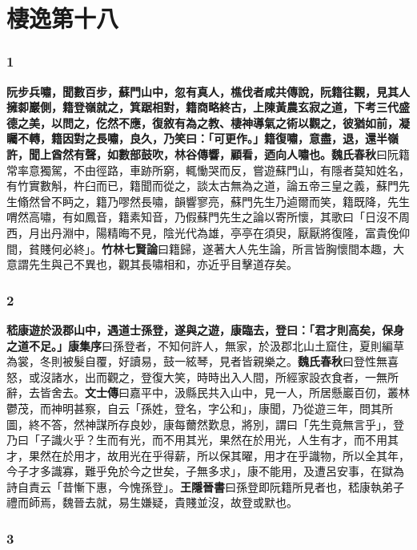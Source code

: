 \chapter{棲逸第十八}

\subsection*{1}

\textbf{阮步兵嘯，聞數百步，蘇門山中，忽有真人，樵伐者咸共傳說，阮籍往觀，見其人擁厀巖側，籍登嶺就之，箕踞相對，籍商略終古，上陳黃農玄寂之道，下考三代盛德之美，以問之，仡然不應，復敘有為之教、棲神導氣之術以觀之，彼猶如前，凝矚不轉，籍因對之長嘯，良久，乃笑曰：「可更作。」籍復嘯，意盡，退，還半嶺許，聞上酋然有聲，如數部鼓吹，林谷傳響，顧看，迺向人嘯也。}{\footnotesize \textbf{魏氏春秋}曰阮籍常率意獨駕，不由徑路，車跡所窮，輒慟哭而反，嘗遊蘇門山，有隱者莫知姓名，有竹實數斛，杵臼而已，籍聞而從之，談太古無為之道，論五帝三皇之義，蘇門先生翛然曾不眄之，籍乃嘐然長嘯，韻響寥亮，蘇門先生乃逌爾而笑，籍既降，先生喟然高嘯，有如鳳音，籍素知音，乃假蘇門先生之論以寄所懷，其歌曰「日沒不周西，月出丹淵中，陽精晦不見，陰光代為雄，亭亭在須臾，厭厭將復隆，富貴俛仰間，貧賤何必終」。\textbf{竹林七賢論}曰籍歸，遂著大人先生論，所言皆胸懷間本趣，大意謂先生與己不異也，觀其長嘯相和，亦近乎目擊道存矣。}

\subsection*{2}

\textbf{嵇康遊於汲郡山中，遇道士孫登，遂與之遊，康臨去，登曰：「君才則高矣，保身之道不足。」}{\footnotesize \textbf{康集序}曰孫登者，不知何許人，無家，於汲郡北山土窟住，夏則編草為裳，冬則被髮自覆，好讀易，鼓一絃琴，見者皆親樂之。\textbf{魏氏春秋}曰登性無喜怒，或沒諸水，出而觀之，登復大笑，時時出入人間，所經家設衣食者，一無所辭，去皆舍去。\textbf{文士傳}曰嘉平中，汲縣民共入山中，見一人，所居懸巖百仞，叢林鬱茂，而神明甚察，自云「孫姓，登名，字公和」，康聞，乃從遊三年，問其所圖，終不答，然神謀所存良妙，康每薾然歎息，將別，謂曰「先生竟無言乎」，登乃曰「子識火乎？生而有光，而不用其光，果然在於用光，人生有才，而不用其才，果然在於用才，故用光在乎得薪，所以保其曜，用才在乎識物，所以全其年，今子才多識寡，難乎免於今之世矣，子無多求」，康不能用，及遭呂安事，在獄為詩自責云「昔慚下惠，今愧孫登」。\textbf{王隱晉書}曰孫登即阮籍所見者也，嵇康執弟子禮而師焉，魏晉去就，易生嫌疑，貴賤並沒，故登或默也。}

\subsection*{3}


